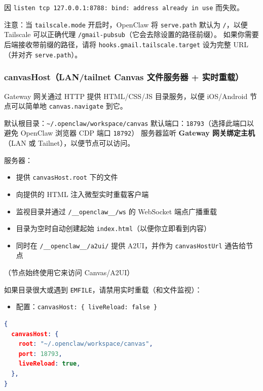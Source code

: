 因 \texttt{listen tcp 127.0.0.1:8788: bind: address already in use} 而失败。

注意：当 \texttt{tailscale.mode} 开启时，OpenClaw 将 \texttt{serve.path} 默认为 \texttt{/}，以便
Tailscale 可以正确代理 \texttt{/gmail-pubsub}（它会去除设置的路径前缀）。
如果你需要后端接收带前缀的路径，请将
\texttt{hooks.gmail.tailscale.target} 设为完整 URL（并对齐 \texttt{serve.path}）。

\subsubsection{canvasHost（LAN/tailnet Canvas 文件服务器 + 实时重载）}


Gateway 网关通过 HTTP 提供 HTML/CSS/JS 目录服务，以便 iOS/Android 节点可以简单地 \texttt{canvas.navigate} 到它。

默认根目录：\texttt{\textasciitilde{}/.openclaw/workspace/canvas}
默认端口：\texttt{18793}（选择此端口以避免 OpenClaw 浏览器 CDP 端口 \texttt{18792}）
服务器监听 \textbf{Gateway 网关绑定主机}（LAN 或 Tailnet），以便节点可以访问。

服务器：

\begin{itemize}
  \item 提供 \texttt{canvasHost.root} 下的文件
  \item 向提供的 HTML 注入微型实时重载客户端
  \item 监视目录并通过 \texttt{/\_\_openclaw\_\_/ws} 的 WebSocket 端点广播重载
  \item 目录为空时自动创建起始 \texttt{index.html}（以便你立即看到内容）
  \item 同时在 \texttt{/\_\_openclaw\_\_/a2ui/} 提供 A2UI，并作为 \texttt{canvasHostUrl} 通告给节点
\end{itemize}

（节点始终使用它来访问 Canvas/A2UI）

如果目录很大或遇到 \texttt{EMFILE}，请禁用实时重载（和文件监视）：

\begin{itemize}
  \item 配置：\texttt{canvasHost: \{ liveReload: false \}}
\end{itemize}


\begin{lstlisting}[language=json]
{
  canvasHost: {
    root: "~/.openclaw/workspace/canvas",
    port: 18793,
    liveReload: true,
  },
}
\end{lstlisting}


